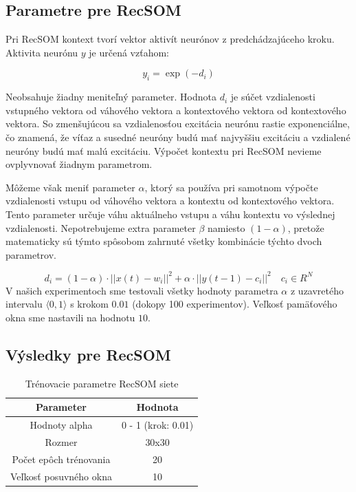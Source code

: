 \subsection{Parametre pre RecSOM}
Pri RecSOM kontext tvorí vektor aktivít neurónov z predchádzajúceho kroku.
Aktivita neurónu $y$ je určená vzťahom:

\begin{equation}
    y_{i} = \exp{(-d_{i})}
\end{equation}

Neobsahuje žiadny meniteľný parameter. Hodnota $d_{i}$ je súčet vzdialenosti vstupného vektora od váhového vektora a kontextového vektora od 
kontextového vektora. So zmenšujúcou sa vzdialenosťou excitácia neurónu rastie exponenciálne, čo 
znamená, že víťaz a susedné neuróny budú mať najvyššiu excitáciu a vzdialené neuróny budú mať malú excitáciu.
Výpočet kontextu pri RecSOM nevieme ovplyvnovať žiadnym parametrom.

Môžeme však meniť parameter $\alpha$, ktorý sa používa pri samotnom výpočte vzdialenosti
vstupu od váhového vektora a kontextu od kontextového vektora. Tento parameter určuje váhu aktuálneho vstupu a váhu kontextu
vo výslednej vzdialenosti.
Nepotrebujeme extra parameter $\beta$ namiesto $(1 - \alpha)$, pretože matematicky sú týmto spôsobom zahrnuté všetky kombinácie
týchto dvoch parametrov.

\begin{equation}
	d_i = (1 - \alpha) \cdot ||x(t) - w_i||^{2} + \alpha \cdot ||y(t-1) - c_i||^{2} \quad c_{i} \in R^{N}
\end{equation}
V našich experimentoch sme testovali všetky hodnoty parametra $\alpha$ z uzavretého intervalu
$\langle0, 1\rangle$ s krokom $0.01$ (dokopy 100 experimentov).
Veľkosť pamäťového okna sme nastavili na hodnotu $10$.

\subsection{Výsledky pre RecSOM}

\begin{table}[h!]
    \centering
    \begin{tabular}{|c|c|} 
     \hline
     Parameter & Hodnota \\ 
     \hline\hline
     Hodnoty alpha & 0 - 1  (krok: 0.01) \\ 
     \hline
     Rozmer & 30x30  \\
     \hline
     Počet epôch trénovania & 20 \\
     \hline
     Veľkosť posuvného okna & 10  \\
     \hline
    \end{tabular}
    \caption{Trénovacie parametre RecSOM siete}
    \label{table:1}
    \end{table}


